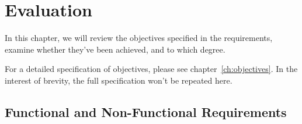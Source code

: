 \chapter{Evaluation}\label{ch:achievement-of-objectives}
In this chapter, we will review the objectives specified in the requirements,
examine whether they've been achieved, and to which degree.

For a detailed specification of objectives, please see chapter~\ref{ch:objectives}.
In the interest of brevity, the full specification won't be repeated here.

\section{Functional and Non-Functional Requirements}\label{sec:functional-and-non-functional-requirements}

